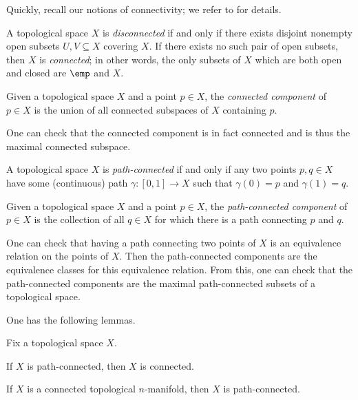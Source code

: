\documentclass[../notes.tex]{subfiles}
\begin{document}
Quickly, recall our notions of connectivity; we refer to \cite[Appendix~A.1]{elber-top} for details.
\begin{definition}[connected]
	A topological space $X$ is \textit{disconnected} if and only if there exists disjoint nonempty open subsets $U,V\subseteq X$ covering $X$. If there exists no such pair of open subsets, then $X$ is \textit{connected}; in other words, the only subsets of $X$ which are both open and closed are $\emp$ and $X$.
\end{definition}
\begin{definition}
	Given a topological space $X$ and a point $p\in X$, the \textit{connected component} of $p\in X$ is the union of all connected subspaces of $X$ containing $p$.
\end{definition}
\begin{remark}
	One can check that the connected component is in fact connected and is thus the maximal connected subspace.
\end{remark}
\begin{definition}
	A topological space $X$ is \textit{path-connected} if and only if any two points $p,q\in X$ have some (continuous) path $\gamma\colon[0,1]\to X$ such that $\gamma(0)=p$ and $\gamma(1)=q$.
\end{definition}
\begin{definition}
	Given a topological space $X$ and a point $p\in X$, the \textit{path-connected component} of $p\in X$ is the collection of all $q\in X$ for which there is a path connecting $p$ and $q$.
\end{definition}
\begin{remark}
	One can check that having a path connecting two points of $X$ is an equivalence relation on the points of $X$. Then the path-connected components are the equivalence classes for this equivalence relation. From this, one can check that the path-connected components are the maximal path-connected subsets of a topological space.
\end{remark}
One has the following lemmas.
\begin{lemma}
	Fix a topological space $X$.
	\begin{listalph}
		\item If $X$ is path-connected, then $X$ is connected.
		\item If $X$ is a connected topological $n$-manifold, then $X$ is path-connected.
	\end{listalph}
\end{lemma}
\end{document}
